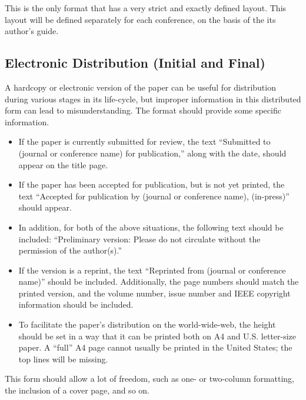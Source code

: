 \documentclass[%
	final,
	notitlepage,
	narroweqnarray,
	inline,
	twoside,
	]{ieee}
\begin{document}
This is the only format that has a very strict and exactly defined
layout.  This layout will be defined separately for each conference,
on the basis of the its author's guide.

\subsection{Electronic Distribution (Initial and Final)}

A hardcopy or electronic version of the paper can be useful for
distribution during various stages in its life-cycle, but improper
information in this distributed form can lead to misunderstanding.
The format should provide some specific information.
\begin{itemize}
\item If the paper is currently submitted for review, the
      text ``Submitted to (journal or conference name) for
      publication,'' along with the date, should appear on the title
      page.  
\item If the paper has been accepted for publication, but is not
      yet printed, the text ``Accepted for publication by (journal or
      conference name), (in-press)'' should appear. 
\item In addition, for both of the above situations, the following text 
      should be included: ``Preliminary version: Please do not circulate 
      without the permission of the author(s).''
\item If the version is a reprint, the 
      text ``Reprinted from (journal or conference name)'' should be 
      included. Additionally, the page numbers should match the printed
      version, and the volume number, issue number and IEEE copyright 
      information should be included. 
\item To facilitate the paper's distribution on the world-wide-web,
      the height should be set 
      in a way that it can be printed both on A4 and U.S. letter-size paper. 
      A ``full'' A4 page cannot usually be printed in the United 
      States; the top lines will be missing. 
\end{itemize}
This form should allow a lot of freedom, such as one- or two-column
formatting, the inclusion of a cover page, and so on.

\end{document}
